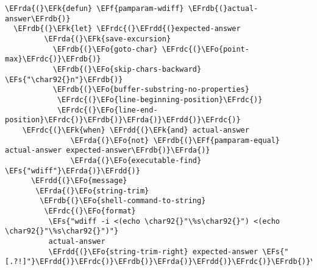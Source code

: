 \documentclass[a4wide,10pt]{article}
\newcommand{\EFs}[1]{\textcolor{EFs}{#1}} %
\newcommand{\EFk}[1]{\textcolor{EFk}{#1}} %
\newcommand{\EFf}[1]{\textcolor{EFf}{#1}} %
\newcommand{\EFo}[1]{\textcolor{EFo}{#1}} %
\newcommand{\EFrda}[1]{\textcolor{EFrda}{#1}} %
\newcommand{\EFrdb}[1]{\textcolor{EFrdb}{#1}} %
\newcommand{\EFrdc}[1]{\textcolor{EFrdc}{#1}} %
\newcommand{\EFrdd}[1]{\textcolor{EFrdd}{#1}} %
\begin{document}
\begin{Code}
\begin{Verbatim}
\EFrda{(}\EFk{defun} \EFf{pamparam-wdiff} \EFrdb{(}actual-answer\EFrdb{)}
  \EFrdb{(}\EFk{let} \EFrdc{(}\EFrdd{(}expected-answer
         \EFrda{(}\EFk{save-excursion}
           \EFrdb{(}\EFo{goto-char} \EFrdc{(}\EFo{point-max}\EFrdc{)}\EFrdb{)}
           \EFrdb{(}\EFo{skip-chars-backward} \EFs{"\char92{}n"}\EFrdb{)}
           \EFrdb{(}\EFo{buffer-substring-no-properties}
            \EFrdc{(}\EFo{line-beginning-position}\EFrdc{)}
            \EFrdc{(}\EFo{line-end-position}\EFrdc{)}\EFrdb{)}\EFrda{)}\EFrdd{)}\EFrdc{)}
    \EFrdc{(}\EFk{when} \EFrdd{(}\EFk{and} actual-answer
               \EFrda{(}\EFo{not} \EFrdb{(}\EFf{pamparam-equal} actual-answer expected-answer\EFrdb{)}\EFrda{)}
               \EFrda{(}\EFo{executable-find} \EFs{"wdiff"}\EFrda{)}\EFrdd{)}
      \EFrdd{(}\EFo{message}
       \EFrda{(}\EFo{string-trim}
        \EFrdb{(}\EFo{shell-command-to-string}
         \EFrdc{(}\EFo{format}
          \EFs{"wdiff -i <(echo \char92{}"\%s\char92{}") <(echo \char92{}"\%s\char92{}")"}
          actual-answer
          \EFrdd{(}\EFo{string-trim-right} expected-answer \EFs{"[.?!]"}\EFrdd{)}\EFrdc{)}\EFrdb{)}\EFrda{)}\EFrdd{)}\EFrdc{)}\EFrdb{)}\EFrda{)}


\end{Verbatim}
\end{Code}
\end{document}
